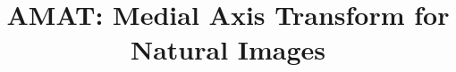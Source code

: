 \documentclass[10pt,twocolumn,letterpaper]{article}
\title{AMAT: Medial Axis Transform for Natural Images}
\begin{document}
\maketitle









{\small


}
\end{document}
